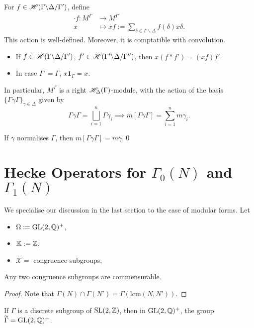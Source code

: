 \begin{defthm}
    For $f\in\mathscr{H}({\Gamma}\backslash {\Delta}\slash {\Gamma'})$, define \begin{align*}
        \cdot f : M^\Gamma &\longrightarrow M^{\Gamma'}\\
            x &\longmapsto xf :=
            \sum_{\delta\in\Gamma\backslash\Delta}
                f(\delta) x\delta.
    \end{align*}
    This action is well-defined.
    Moreover, it is comptatible with convolution.\begin{itemize}
        \item If $f\in\mathscr{H}({\Gamma}\backslash {\Delta}\slash {\Gamma'})$, $f'\in\mathscr{H}({\Gamma'}\backslash {\Delta}\slash {\Gamma''})$, then $x(f*f') = (xf)f'$.
        \item In case $\Gamma' = \Gamma$, $x \boldsymbol{1}_\Gamma = x$.
    \end{itemize}
    In particular, $M^\Gamma$ is a right $\mathscr{H}_\Delta(\Gamma)$-module,
    with the action of the basis $\{\Gamma\gamma\Gamma\}_{\gamma\in\Delta}$ given by \[\Gamma\gamma\Gamma = \bigsqcup_{i=1}^n \Gamma \gamma_i
    \implies m[\Gamma\gamma\Gamma] = \sum_{i=1}^n m\gamma_i.\]
\end{defthm}
\begin{corollary}
    If $\gamma$ normalises $\Gamma$, then $m[\Gamma
    \gamma\Gamma] = m\gamma$.\qed
\end{corollary}

\section{\texorpdfstring{{Hecke Operators for $\Gamma_0(N)$ and $\Gamma_1(N)$}}{Hecke Operators for Gamma0(N) and Gamma1(N)}}

We specialise our discussion in the last section to the case of modular forms. Let \begin{itemize}
    \item $\Omega := \operatorname{GL}(2, \mathbb{Q})^+$,
    \item $\mathbb{K} := \mathbb{Z}$,
    \item $\mathscr{X} = $ congruence subgroups,
\end{itemize}

\begin{lemma}
    Any two congruence subgroups are commensurable.
\end{lemma}
\begin{proof}
    Note that $\Gamma(N)\cap \Gamma(N') = \Gamma(\mathrm{lcm}(N, N'))$.
\end{proof}
\begin{lemma}
    If $\Gamma$ is a discrete subgroup of $\operatorname{SL}(2,\mathbb{Z})$, then in $\operatorname{GL}(2, \mathbb{Q})^+$, the group $\widetilde{\Gamma} = \operatorname{GL}(2, \mathbb{Q})^+$.
\end{lemma}


